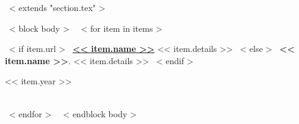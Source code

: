 ~< extends "section.tex" >~


~< block body >~
~< for item in items >~
\begin{minipage}[t]{0.8\textwidth}
  ~< if item.url >~
	\textbf{\href{<< item.url >>}{<< item.name >>}} << item.details >>
  ~< else >~
	\textbf{<< item.name >>}. << item.details >>
  ~< endif >~
\end{minipage}\hfill
\begin{minipage}[t]{0.2\textwidth}
  \hfill << item.year >> 
\end{minipage}\\
~< endfor >~
~< endblock body >~
